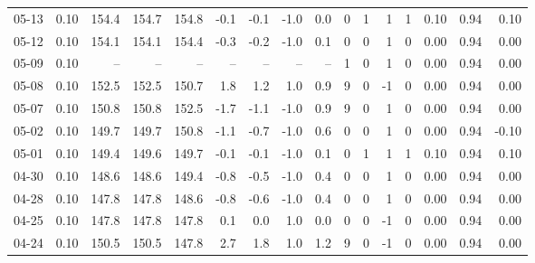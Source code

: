 \begin{threeparttable}
{\begin{tabular}{lrrrrrrrrrrrrrrr}
  05-13 &     0.10 & 154.4 & 154.7 & 154.8 &       -0.1 &           -0.1 &                     -1.0 &                 0.0 &              0 &         1 &     1 &         1 &       0.10 &      0.94 &           0.10 \\
  05-12 &     0.10 & 154.1 & 154.1 & 154.4 &       -0.3 &           -0.2 &                     -1.0 &                 0.1 &              0 &         0 &     1 &         0 &       0.00 &      0.94 &           0.00 \\
  05-09 &     0.10 &    -- &    -- &    -- &         -- &             -- &                       -- &                  -- &              1 &         0 &     1 &         0 &       0.00 &      0.94 &           0.00 \\
  05-08 &     0.10 & 152.5 & 152.5 & 150.7 &        1.8 &            1.2 &                      1.0 &                 0.9 &              9 &         0 &    -1 &         0 &       0.00 &      0.94 &           0.00 \\
  05-07 &     0.10 & 150.8 & 150.8 & 152.5 &       -1.7 &           -1.1 &                     -1.0 &                 0.9 &              9 &         0 &     1 &         0 &       0.00 &      0.94 &           0.00 \\
  05-02 &     0.10 & 149.7 & 149.7 & 150.8 &       -1.1 &           -0.7 &                     -1.0 &                 0.6 &              0 &         0 &     1 &         0 &       0.00 &      0.94 &          -0.10 \\
  05-01 &     0.10 & 149.4 & 149.6 & 149.7 &       -0.1 &           -0.1 &                     -1.0 &                 0.1 &              0 &         1 &     1 &         1 &       0.10 &      0.94 &           0.10 \\
  04-30 &     0.10 & 148.6 & 148.6 & 149.4 &       -0.8 &           -0.5 &                     -1.0 &                 0.4 &              0 &         0 &     1 &         0 &       0.00 &      0.94 &           0.00 \\
  04-28 &     0.10 & 147.8 & 147.8 & 148.6 &       -0.8 &           -0.6 &                     -1.0 &                 0.4 &              0 &         0 &     1 &         0 &       0.00 &      0.94 &           0.00 \\
  04-25 &     0.10 & 147.8 & 147.8 & 147.8 &        0.1 &            0.0 &                      1.0 &                 0.0 &              0 &         0 &    -1 &         0 &       0.00 &      0.94 &           0.00 \\
  04-24 &     0.10 & 150.5 & 150.5 & 147.8 &        2.7 &            1.8 &                      1.0 &                 1.2 &              9 &         0 &    -1 &         0 &       0.00 &      0.94 &           0.00 \\

\end{tabular}}
\end{threeparttable}
